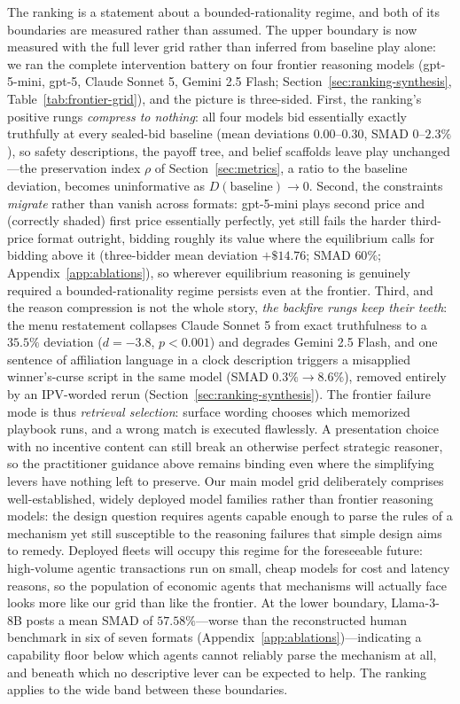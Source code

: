 The ranking is a statement about a bounded-rationality regime, and both of its boundaries are measured rather than assumed. The upper boundary is now measured with the full lever grid rather than inferred from baseline play alone: we ran the complete intervention battery on four frontier reasoning models (gpt-5-mini, gpt-5, Claude Sonnet 5, Gemini 2.5 Flash; Section~\ref{sec:ranking-synthesis}, Table~\ref{tab:frontier-grid}), and the picture is three-sided. First, the ranking's positive rungs \emph{compress to nothing}: all four models bid essentially exactly truthfully at every sealed-bid baseline (mean deviations $0.00$--$0.30$, SMAD $0$--$2.3\%$), so safety descriptions, the payoff tree, and belief scaffolds leave play unchanged---the preservation index $\rho$ of Section~\ref{sec:metrics}, a ratio to the baseline deviation, becomes uninformative as $D(\text{baseline}) \to 0$. Second, the constraints \emph{migrate} rather than vanish across formats: gpt-5-mini plays second price and (correctly shaded) first price essentially perfectly, yet still fails the harder third-price format outright, bidding roughly its value where the equilibrium calls for bidding above it (three-bidder mean deviation $+\$14.76$; SMAD $60\%$; Appendix~\ref{app:ablations}), so wherever equilibrium reasoning is genuinely required a bounded-rationality regime persists even at the frontier. Third, and the reason compression is not the whole story, \emph{the backfire rungs keep their teeth}: the menu restatement collapses Claude Sonnet 5 from exact truthfulness to a $35.5\%$ deviation ($d=-3.8$, $p<0.001$) and degrades Gemini 2.5 Flash, and one sentence of affiliation language in a clock description triggers a misapplied winner's-curse script in the same model (SMAD $0.3\% \to 8.6\%$), removed entirely by an IPV-worded rerun (Section~\ref{sec:ranking-synthesis}). The frontier failure mode is thus \emph{retrieval selection}: surface wording chooses which memorized playbook runs, and a wrong match is executed flawlessly. A presentation choice with no incentive content can still break an otherwise perfect strategic reasoner, so the practitioner guidance above remains binding even where the simplifying levers have nothing left to preserve. Our main model grid deliberately comprises well-established, widely deployed model families rather than frontier reasoning models: the design question requires agents capable enough to parse the rules of a mechanism yet still susceptible to the reasoning failures that simple design aims to remedy. Deployed fleets will occupy this regime for the foreseeable future: high-volume agentic transactions run on small, cheap models for cost and latency reasons, so the population of economic agents that mechanisms will actually face looks more like our grid than like the frontier. At the lower boundary, Llama-3-8B posts a mean SMAD of $57.58\%$---worse than the reconstructed human benchmark in six of seven formats (Appendix~\ref{app:ablations})---indicating a capability floor below which agents cannot reliably parse the mechanism at all, and beneath which no descriptive lever can be expected to help. The ranking applies to the wide band between these boundaries.

